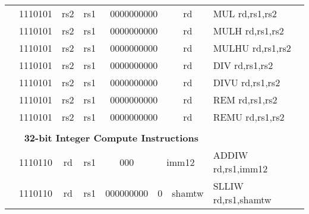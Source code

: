 \begin{table}[p]
\begin{small}
\begin{center}
\begin{tabular}{rcccccccccccl}
&
\multicolumn{2}{|c|}{1110101} &
\multicolumn{1}{c|}{rs2} &
\multicolumn{1}{c|}{rs1} &
\multicolumn{6}{c|}{0000000000} &
\multicolumn{1}{c|}{rd} & MUL rd,rs1,rs2 \\
\cline{2-12}
  

&
\multicolumn{2}{|c|}{1110101} &
\multicolumn{1}{c|}{rs2} &
\multicolumn{1}{c|}{rs1} &
\multicolumn{6}{c|}{0000000000} &
\multicolumn{1}{c|}{rd} & MULH rd,rs1,rs2 \\
\cline{2-12}
  

&
\multicolumn{2}{|c|}{1110101} &
\multicolumn{1}{c|}{rs2} &
\multicolumn{1}{c|}{rs1} &
\multicolumn{6}{c|}{0000000000} &
\multicolumn{1}{c|}{rd} & MULHU rd,rs1,rs2 \\
\cline{2-12}
  

&
\multicolumn{2}{|c|}{1110101} &
\multicolumn{1}{c|}{rs2} &
\multicolumn{1}{c|}{rs1} &
\multicolumn{6}{c|}{0000000000} &
\multicolumn{1}{c|}{rd} & DIV rd,rs1,rs2 \\
\cline{2-12}
  

&
\multicolumn{2}{|c|}{1110101} &
\multicolumn{1}{c|}{rs2} &
\multicolumn{1}{c|}{rs1} &
\multicolumn{6}{c|}{0000000000} &
\multicolumn{1}{c|}{rd} & DIVU rd,rs1,rs2 \\
\cline{2-12}
  

&
\multicolumn{2}{|c|}{1110101} &
\multicolumn{1}{c|}{rs2} &
\multicolumn{1}{c|}{rs1} &
\multicolumn{6}{c|}{0000000000} &
\multicolumn{1}{c|}{rd} & REM rd,rs1,rs2 \\
\cline{2-12}
  

&
\multicolumn{2}{|c|}{1110101} &
\multicolumn{1}{c|}{rs2} &
\multicolumn{1}{c|}{rs1} &
\multicolumn{6}{c|}{0000000000} &
\multicolumn{1}{c|}{rd} & REMU rd,rs1,rs2 \\
\cline{2-12}
  

&
\multicolumn{11}{c}{} & \\
&
\multicolumn{11}{c}{\bf 32-bit Integer Compute Instructions} & \\
\cline{2-12}
  

&
\multicolumn{2}{|c|}{1110110} &
\multicolumn{1}{c|}{rd} &
\multicolumn{1}{c|}{rs1} &
\multicolumn{2}{c|}{000} &
\multicolumn{5}{c|}{imm12} & ADDIW rd,rs1,imm12 \\
\cline{2-12}
  

&
\multicolumn{2}{|c|}{1110110} &
\multicolumn{1}{c|}{rd} &
\multicolumn{1}{c|}{rs1} &
\multicolumn{5}{c|}{000000000} &
\multicolumn{1}{c|}{0} &
\multicolumn{1}{c|}{shamtw} & SLLIW rd,rs1,shamtw \\
\cline{2-12}
  


\end{tabular}
\end{center}
\end{small}
\end{table}
